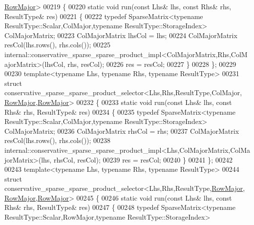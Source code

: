 \begin{DoxyCode}
      \hyperlink{group__enums_ggaacded1a18ae58b0f554751f6cdf9eb13acfcde9cd8677c5f7caf6bd603666aae3}{RowMajor}>
00219 \{
00220   \textcolor{keyword}{static} \textcolor{keywordtype}{void} run(\textcolor{keyword}{const} Lhs& lhs, \textcolor{keyword}{const} Rhs& rhs, ResultType& res)
00221   \{
00222     \textcolor{keyword}{typedef} SparseMatrix<typename ResultType::Scalar,ColMajor,typename ResultType::StorageIndex> 
      ColMajorMatrix;
00223     ColMajorMatrix lhsCol = lhs;
00224     ColMajorMatrix resCol(lhs.rows(), rhs.cols());
00225     internal::conservative\_sparse\_sparse\_product\_impl<ColMajorMatrix,Rhs,ColMajorMatrix>(lhsCol, rhs, 
      resCol);
00226     res = resCol;
00227   \}
00228 \};
00229 
00230 \textcolor{keyword}{template}<\textcolor{keyword}{typename} Lhs, \textcolor{keyword}{typename} Rhs, \textcolor{keyword}{typename} ResultType>
00231 \textcolor{keyword}{struct }conservative\_sparse\_sparse\_product\_selector<Lhs,Rhs,ResultType,ColMajor,
      \hyperlink{group__enums_ggaacded1a18ae58b0f554751f6cdf9eb13acfcde9cd8677c5f7caf6bd603666aae3}{RowMajor},\hyperlink{group__enums_ggaacded1a18ae58b0f554751f6cdf9eb13acfcde9cd8677c5f7caf6bd603666aae3}{RowMajor}>
00232 \{
00233   \textcolor{keyword}{static} \textcolor{keywordtype}{void} run(\textcolor{keyword}{const} Lhs& lhs, \textcolor{keyword}{const} Rhs& rhs, ResultType& res)
00234   \{
00235     \textcolor{keyword}{typedef} SparseMatrix<typename ResultType::Scalar,ColMajor,typename ResultType::StorageIndex> 
      ColMajorMatrix;
00236     ColMajorMatrix rhsCol = rhs;
00237     ColMajorMatrix resCol(lhs.rows(), rhs.cols());
00238     internal::conservative\_sparse\_sparse\_product\_impl<Lhs,ColMajorMatrix,ColMajorMatrix>(lhs, rhsCol, 
      resCol);
00239     res = resCol;
00240   \}
00241 \};
00242 
00243 \textcolor{keyword}{template}<\textcolor{keyword}{typename} Lhs, \textcolor{keyword}{typename} Rhs, \textcolor{keyword}{typename} ResultType>
00244 \textcolor{keyword}{struct }conservative\_sparse\_sparse\_product\_selector<Lhs,Rhs,ResultType,\hyperlink{group__enums_ggaacded1a18ae58b0f554751f6cdf9eb13acfcde9cd8677c5f7caf6bd603666aae3}{RowMajor},
      \hyperlink{group__enums_ggaacded1a18ae58b0f554751f6cdf9eb13acfcde9cd8677c5f7caf6bd603666aae3}{RowMajor},\hyperlink{group__enums_ggaacded1a18ae58b0f554751f6cdf9eb13acfcde9cd8677c5f7caf6bd603666aae3}{RowMajor}>
00245 \{
00246   \textcolor{keyword}{static} \textcolor{keywordtype}{void} run(\textcolor{keyword}{const} Lhs& lhs, \textcolor{keyword}{const} Rhs& rhs, ResultType& res)
00247   \{
00248     \textcolor{keyword}{typedef} SparseMatrix<typename ResultType::Scalar,RowMajor,typename ResultType::StorageIndex> 

\end{DoxyCode}

